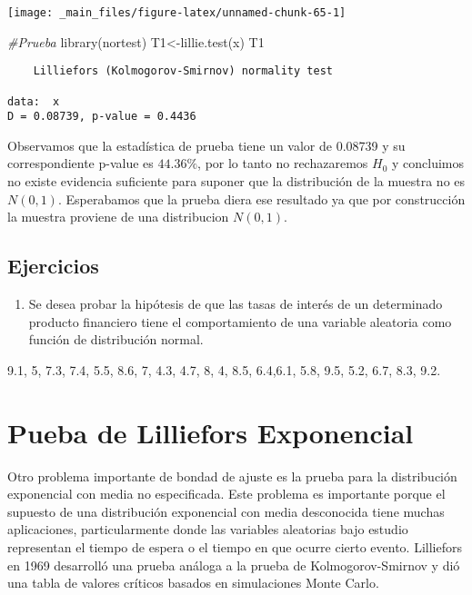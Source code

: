 \documentclass[
  a4paper,
  oneside,
  openany]{book}
\newenvironment{Shaded}{\begin{snugshade}}{\end{snugshade}}
\newcommand{\CommentTok}[1]{\textcolor[rgb]{0.56,0.35,0.01}{\textit{#1}}}
\newcommand{\FunctionTok}[1]{\textcolor[rgb]{0.00,0.00,0.00}{#1}}
\newcommand{\NormalTok}[1]{#1}
\newcommand{\OtherTok}[1]{\textcolor[rgb]{0.56,0.35,0.01}{#1}}
\providecommand{\tightlist}{%
  \setlength{\itemsep}{0pt}\setlength{\parskip}{0pt}}
\begin{document}
\begin{center}\texttt{[image: \_main\_files/figure-latex/unnamed-chunk-65-1]} \end{center}

\begin{Shaded}
\begin{Highlighting}[]
\CommentTok{\#Prueba}
\FunctionTok{library}\NormalTok{(nortest) }
\NormalTok{T1}\OtherTok{\textless{}{-}}\FunctionTok{lillie.test}\NormalTok{(x)}
\NormalTok{T1}
\end{Highlighting}
\end{Shaded}

\begin{verbatim}
    Lilliefors (Kolmogorov-Smirnov) normality test

data:  x
D = 0.08739, p-value = 0.4436
\end{verbatim}

Observamos que la estadística de prueba tiene un valor de 0.08739 y su correspondiente p-value es \(44.36\%\), por lo tanto no rechazaremos \(H_0\) y concluimos no existe evidencia suficiente para suponer que la distribución de la muestra no es \(N(0,1)\). Esperabamos que la prueba diera ese resultado ya que por construcción la muestra proviene de una distribucion \(N(0,1)\).

\hypertarget{ejercicios-14}{%
\section{Ejercicios}\label{ejercicios-14}}

\begin{enumerate}
\def\labelenumi{\arabic{enumi}.}
\tightlist
\item
  Se desea probar la hipótesis de que las tasas de interés de un determinado producto financiero tiene el comportamiento de una variable aleatoria como función de distribución normal.
\end{enumerate}

9.1, 5, 7.3, 7.4, 5.5, 8.6, 7, 4.3, 4.7, 8,
4, 8.5, 6.4,6.1, 5.8, 9.5, 5.2, 6.7, 8.3, 9.2.

\hypertarget{pueba-de-lilliefors-exponencial}{%
\chapter{Pueba de Lilliefors Exponencial}\label{pueba-de-lilliefors-exponencial}}

Otro problema importante de bondad de ajuste es la prueba para la distribución exponencial con media no especificada. Este problema es importante porque el supuesto de una distribución exponencial con media desconocida tiene muchas aplicaciones, particularmente donde las variables aleatorias bajo estudio representan el tiempo de espera o el tiempo en que ocurre cierto evento.
Lilliefors en 1969 desarrolló una prueba análoga a la prueba de Kolmogorov-Smirnov y dió una tabla de valores críticos basados en simulaciones Monte Carlo.
\end{document}
